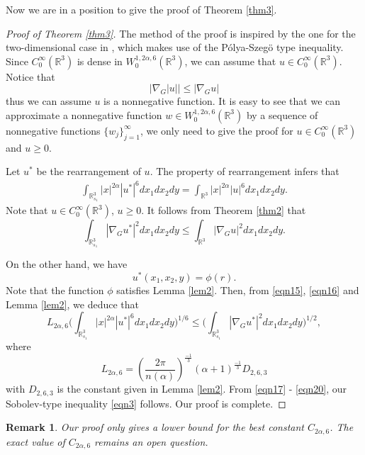 \documentclass[10pt, reqno]{amsart}
\newtheorem{remark}{Remark}
\begin{document}
	Now we are in a position to give the proof of Theorem \ref{thm3}.
	
	\begin{proof}[Proof of Theorem \ref{thm3}]
		The method of the proof is inspired by the one for the two-dimensional case in \cite{nga}, which makes use of the P\'olya-Szeg\"o type inequality. Since $C^\infty_0(\mathbb{R}^3)$ is dense in $W^{1,2\alpha,6}_0(\mathbb{R}^3)$, we can assume that $u \in C^\infty_0(\mathbb{R}^3)$. Notice that 
		$$|\nabla_G |u|| \leq |\nabla_G u|$$
		thus we can assume $u$ is a nonnegative function. It is easy to see that we can approximate a nonnegative function $w \in W^{1,2\alpha,6}_0(\mathbb{R}^3)$ by a sequence of nonnegative functions $\{w_j\}_{j=1}^\infty$, we only need to give the proof for $u \in C^\infty_0(\mathbb{R}^3)$ and $u\geq 0$.
		
		Let $u^*$ be the rearrangement of $u$. The property of rearrangement infers that
		\begin{align}\label{eqn17}
			\int_{\mathbb{R}^3_{s_1}} |x|^{2\alpha} |u^*|^{6} dx_1dx_2dy = \int_{\mathbb{R}^3} |x|^{2\alpha} |u|^{6} dx_1dx_2dy.
		\end{align}
		Note that $u \in C^\infty_0(\mathbb{R}^3)$, $u\geq 0$. It follows from Theorem \ref{thm2} that
		\begin{equation}\label{eqn18}
			\int_{\mathbb{R}^3_{s_1}} |\nabla_G u^*|^2 dx_1dx_2dy \leq \int_{\mathbb{R}^3} |\nabla_G u|^2dx_1dx_2dy.
		\end{equation}
		
		On the other hand, we have
		$$u^*(x_1,x_2,y) = \phi(r).$$ 
		Note that the function $\phi$ satisfies Lemma \ref{lem2}. Then, from \eqref{eqn15}, \eqref{eqn16} and Lemma \ref{lem2}, we deduce that
		\begin{equation}\label{eqn19}
			L_{2\alpha,6} \bigg( \int_{\mathbb{R}^3_{s_1}} |x|^{2\alpha} |u^*|^{6} dx_1dx_2dy\bigg)^{1/6} \leq \bigg( \int_{\mathbb{R}^3_{s_1}} |\nabla_G u^*|^2dx_1dx_2dy\bigg)^{1/2},
		\end{equation}
		where
		\begin{equation}\label{eqn20}
			L_{2\alpha,6} = \left( \dfrac{2\pi}{n(\alpha)}\right)^{\frac{-1}{3}} (\alpha+1)^{ \frac{-1}{3}} D_{2,6,3} 
		\end{equation}
		with $D_{2,6,3}$ is the constant given in Lemma \ref{lem2}. From \eqref{eqn17} - \eqref{eqn20}, our Sobolev-type inequality \eqref{eqn3} follows. Our proof is complete.
	\end{proof}
	
	\begin{remark}
		\label{rem3}
		Our proof only gives a lower bound for the best constant $C_{2\alpha,6}$. The exact value of $C_{2\alpha,6}$ remains an open question.
	\end{remark}
	
\end{document}
